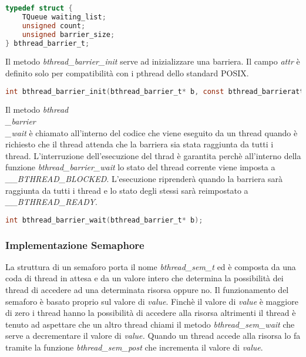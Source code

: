 \documentclass{article}
\begin{document}
\begin{lstlisting}[language=C]
typedef struct {
    TQueue waiting_list;
    unsigned count;
    unsigned barrier_size;
} bthread_barrier_t;
\end{lstlisting}

Il metodo \textit{bthread\_barrier\_init} serve ad inizializzare una barriera. Il campo \textit{attr} è definito solo per compatibilità con i pthread dello standard POSIX.

\begin{lstlisting}[language=C]
int bthread_barrier_init(bthread_barrier_t* b, const bthread_barrierattr_t* attr, unsigned count);
\end{lstlisting}

Il metodo \textit{bthread\\_barrier\\_wait} è chiamato all'interno del codice che viene eseguito da un thread quando è richiesto che il thread attenda che la barriera sia stata raggiunta da tutti i thread.
\newline
L'interruzione dell'esecuzione del thrad è garantita perchè all'interno della funzione \textit{bthread_barrier_wait} lo stato del thread corrente viene imposta a \textit{\_\_BTHREAD\_BLOCKED}. L'esecuzione riprenderà quando la barriera sarà raggiunta da tutti i thread e lo stato degli stessi sarà reimpostato a \textit{\_\_BTHREAD\_READY}.

\begin{lstlisting}[language=C]
int bthread_barrier_wait(bthread_barrier_t* b);
\end{lstlisting}


\subsubsection{Implementazione Semaphore}
\vspace{2mm}
La struttura di un semaforo porta il nome \textit{bthread_sem_t} ed è composta da una coda di thread in attesa e da un valore intero che determina la possibilità dei thread di accedere ad una determinata risorsa oppure no. Il funzionamento del semaforo è basato proprio sul valore di \textit{value}. Finchè il valore di \textit{value} è maggiore di zero i thread hanno la possibilità di accedere alla risorsa altrimenti il thread è tenuto ad aspettare che un altro thread chiami il metodo \textit{bthread_sem_wait} che serve a decrementare il valore di \textit{value.} Quando un thread accede alla risorsa lo fa tramite la funzione \textit{bthread_sem_post} che incrementa il valore di \textit{value}.
\end{document}
